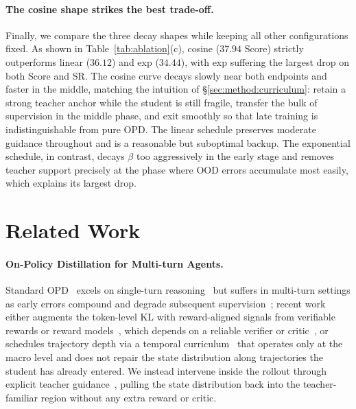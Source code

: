 \documentclass[11pt]{article}
\begin{document}
\paragraph{The cosine shape strikes the best trade-off.}
Finally, we compare the three decay shapes while keeping all other configurations fixed. As shown in Table~\ref{tab:ablation}(c), cosine ($37.94$ Score) strictly outperforms linear ($36.12$) and exp ($34.44$), with exp suffering the largest drop on both Score and SR. The cosine curve decays slowly near both endpoints and faster in the middle, matching the intuition of \S\ref{sec:method:curriculum}: retain a strong teacher anchor while the student is still fragile, transfer the bulk of supervision in the middle phase, and exit smoothly so that late training is indistinguishable from pure OPD. The linear schedule preserves moderate guidance throughout and is a reasonable but suboptimal backup. 
The exponential schedule, in contrast, decays $\beta$ too aggressively in the early stage and removes teacher support precisely at the phase where OOD errors accumulate most easily, which explains its largest drop.

\section{Related Work}
\label{sec:related}

\paragraph{On-Policy Distillation for Multi-turn Agents.}
Standard OPD~\citep{opd, lu2025onpolicydistillation} excels on single-turn reasoning~\citep{eopd, tip, yang2026learning} but suffers in multi-turn settings as early errors compound
and degrade subsequent supervision~\citep{DAgger, fu2026revisiting, li2026rethinking}; 
recent work either augments the token-level KL with reward-aligned signals from verifiable rewards or reward models~\citep{zhong2026sod, skillsd, srpo}, which depends on a reliable verifier or critic~\citep{deepseek2025r1, grpo, yu2025dapo}, 
or schedules trajectory depth via a temporal curriculum~\citep{wang2026tcod} that operates only at the macro level and does not repair the state distribution along trajectories the student has already entered.
We instead intervene inside the rollout through explicit teacher guidance~\citep{DAgger}, pulling the state distribution back into the teacher-familiar region without any extra reward or critic.
\end{document}
